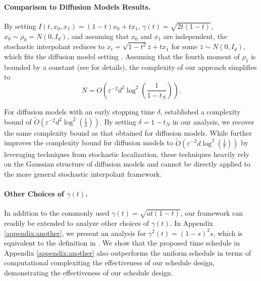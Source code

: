 \paragraph{Comparison to Diffusion Models Results.} By setting $I(t,x_0,x_1)=(1-t)x_0+tx_1$, $\gamma(t)=\sqrt{2t(1-t)}$, $x_0\sim\rho_0=N(0,I_d)$, and assuming that $x_0$ and $x_1$ are independent, the stochastic interpolant reduces to $x_t=\sqrt{1-t^2}\bar{z}+tx_1$ for some $\bar{z}\sim N(0,I_d)$, which fits the diffusion model setting \cite{song2021scorebased}. %
Assuming that the fourth moment of $\rho_1$ is bounded by a constant (see  for details), the complexity of our approach simplifies to $$N=O\left(\varepsilon^{-2}d^2\log^2\left(\frac{1}{1-t_N}\right)\right).$$

For diffusion models with an early stopping time $\delta$, \citet{chen2023improved} established a complexity bound of $\tilde{O}\left(\varepsilon^{-2}d^2\log^2\left(\frac{1}{\delta}\right)\right)$.
By setting $\delta=1-t_N$ in our analysis, we recover the same complexity bound as that obtained for diffusion models. %
% 
While \citet{dlinear} further improves the complexity bound for diffusion models to $\tilde{O}\left(\varepsilon^{-2}d\log^2\left(\frac{1}{\delta}\right)\right)$ by leveraging techniques from stochastic localization, these techniques heavily rely on the Gaussian structure of diffusion models and cannot be directly applied to the more general stochastic interpolant framework.

\paragraph{Other Choices of $\gamma(t)$.} In addition to the commonly used $\gamma(t)=\sqrt{at(1-t)}$, our framework can readily be extended to analyze other choices of $\gamma(t)$. In Appendix \ref{appendix:another}, we present an analysis for $\gamma^2(t)=(1-s)^2s$, which is equivalent to the definition in \citet{chen2024forcasting}. We show that the proposed time schedule in Appendix \ref{appendix:another} also outperforms the uniform schedule in terms of computational complexiting the effectiveness of our schedule design, demonstrating the effectiveness of our schedule design. %

